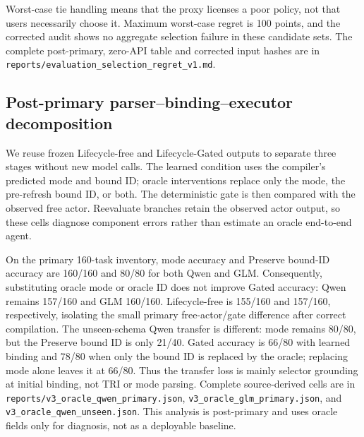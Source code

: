 \documentclass[10pt]{article}
\begin{document}
Worst-case tie handling means that the proxy licenses a poor policy, not that users necessarily
choose it. Maximum worst-case regret is 100 points, and the corrected audit shows no aggregate
selection failure in these candidate sets. The complete post-primary, zero-API table and corrected
input hashes are in \texttt{reports/evaluation\_selection\_regret\_v1.md}.

\subsection{Post-primary parser--binding--executor decomposition}
We reuse frozen \PrimaryDiagnostic{} Lifecycle-free and Lifecycle-Gated outputs to separate three stages without
new model calls. The learned condition uses the compiler's predicted mode and bound ID; oracle
interventions replace only the mode, the pre-refresh bound ID, or both. The deterministic gate is
then compared with the observed free actor. Reevaluate branches retain the observed actor output,
so these cells diagnose component errors rather than estimate an oracle end-to-end agent.

On the primary 160-task inventory, mode accuracy and Preserve bound-ID accuracy are 160/160 and
80/80 for both Qwen and GLM. Consequently, substituting oracle mode or oracle ID does not improve
Gated accuracy: Qwen remains 157/160 and GLM 160/160. Lifecycle-free is 155/160 and 157/160,
respectively, isolating the small primary free-actor/gate difference after correct compilation.
The unseen-schema Qwen transfer is different: mode remains 80/80, but the Preserve bound ID is
only 21/40. Gated accuracy is 66/80 with learned binding and 78/80 when only the bound ID is
replaced by the oracle; replacing mode alone leaves it at 66/80. Thus the transfer loss is mainly
selector grounding at initial binding, not TRI or mode parsing. Complete source-derived cells are
in \texttt{reports/v3\_oracle\_qwen\_primary.json},
\texttt{v3\_oracle\_glm\_primary.json}, and
\texttt{v3\_oracle\_qwen\_unseen.json}. This analysis is post-primary and uses oracle fields only
for diagnosis, not as a deployable baseline.
\end{document}
